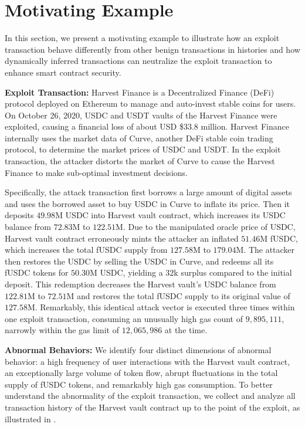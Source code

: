\vspace{-1ex}
\section{Motivating Example}\label{sec:example}
\vspace{-1ex}

In this section, we present a motivating example to illustrate how an exploit
transaction behave differently from other benign transactions in histories and
how dynamically inferred transactions can neutralize the exploit transaction to
enhance smart contract security.


\noindent \textbf{Exploit Transaction:} Harvest Finance is a Decentralized
Finance (DeFi) protocol deployed on Ethereum to manage and auto-invest stable
coins for users. On October 26, 2020, USDC and USDT vaults of the Harvest
Finance were exploited, causing a financial loss of about USD \$$33.8$ million.
Harvest Finance internally uses the market data of Curve, another DeFi stable
coin trading protocol, to determine the market prices of USDC and USDT. In the
exploit transaction, the attacker distorts the market of Curve to cause the
Harvest Finance to make sub-optimal investment decisions.

Specifically, the attack transaction first borrows a large
amount of digital assets and uses the borrowed asset to buy USDC in Curve to
inflate its price. Then it deposits $49.98$M USDC into Harvest
vault contract, which increases its USDC balance from $72.83$M to $122.51$M.
Due to the manipulated oracle price of USDC, Harvest vault contract erroneously
mints the attacker an inflated $51.46$M fUSDC, which increases the total fUSDC
supply from $127.58$M to $179.04$M. The attacker then restores the USDC by
selling the USDC in Curve, and redeems all its fUSDC tokens for $50.30$M USDC,
yielding a $32$k surplus compared to the initial deposit. This redemption
decreases the Harvest vault's USDC balance from $122.81$M to $72.51$M and
restores the total fUSDC supply to its original value of $127.58$M.
Remarkably, this identical attack vector is executed three times
within one exploit transaction, consuming an unusually high gas count of
$9,895,111$, narrowly within the gas limit of $12,065,986$ at the time. 

\noindent \textbf{Abnormal Behaviors:} We identify four distinct dimensions of
abnormal behavior: a high frequency of user interactions with the Harvest vault
contract, an exceptionally large volume of token flow, abrupt fluctuations in
the total supply of fUSDC tokens, and remarkably high gas consumption. To
better understand the abnormality of the exploit transaction, we collect and
analyze all transaction history of the Harvest vault contract up to the point
of the exploit, as illustrated in . 

